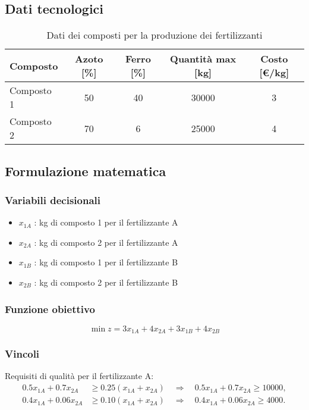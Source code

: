 \subsection{Dati tecnologici}
\begin{table}[h]
\centering
\begin{tabular}{|l|c|c|c|c|}

\hline
\textbf{Composto} & \textbf{Azoto [\%]} & \textbf{Ferro [\%]} & \textbf{Quantità max [kg]} & \textbf{Costo [€/kg]} \\
\hline
Composto 1       & 50                 & 40               & 30000                    & 3                    \\
\hline
Composto 2       & 70                 & 6                & 25000                    & 4                    \\
\hline
\end{tabular}
\caption{Dati dei composti per la produzione dei fertilizzanti}
\end{table}

\subsection{Formulazione matematica}

\subsubsection{Variabili decisionali}
\begin{itemize}
    \item $x_{1A}$ : kg di composto 1 per il fertilizzante A
    \item $x_{2A}$ : kg di composto 2 per il fertilizzante A
    \item $x_{1B}$ : kg di composto 1 per il fertilizzante B
    \item $x_{2B}$ : kg di composto 2 per il fertilizzante B
\end{itemize}

\subsubsection{Funzione obiettivo}
\[ 
\min z = 3x_{1A}+4x_{2A}+3x_{1B}+4x_{2B}
\]

\subsubsection{Vincoli}
Requisiti di qualità per il fertilizzante A:
\[ 
\begin{aligned}
0.5x_{1A}+0.7x_{2A} &\geq 0.25(x_{1A}+x_{2A})\quad\Rightarrow\quad 0.5x_{1A}+0.7x_{2A}\geq 10000, \\
0.4x_{1A}+0.06x_{2A} &\geq 0.10(x_{1A}+x_{2A})\quad\Rightarrow\quad 0.4x_{1A}+0.06x_{2A}\geq 4000.
\end{aligned}
\]

